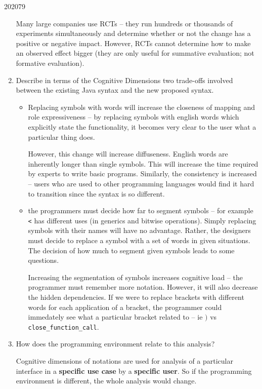 \documentclass[10pt,\jkfside,a4paper]{article}
\begin{document}
\begin{examquestion}{2020}{7}{9}
\begin{enumerate}
\begin{itemize}
\end{itemize}

Many large companies use RCTs -- they run hundreds or thousands of
experiments simultaneously and determine whether or not the change has a
positive or negative impact. However, RCTs cannot determine how to make an
observed effect bigger (they are only useful for summative evaluation; not
formative evaluation).

\item Describe in terms of the Cognitive Dimensions two trade-offs involved
between the existing Java syntax and the new proposed syntax.

\begin{itemize}

\item Replacing symbols with words will increase the closeness of mapping
and role expressiveness -- by replacing symbols with english words which
explicitly state the functionality, it becomes very clear to the user what
a particular thing does.

However, this change will increase diffuseness. English words are
inherently longer than single symbols. This will increase the time required
by experts to write basic programs. Similarly, the consistency is increased
-- users who are used to other programming languages would find it hard to
transition since the syntax is so different.

\item the programmers must decide how far to segment symbols -- for example
\texttt{<} has different uses (in generics and bitwise operations). Simply
replacing symbols with their names will have no advantage. Rather, the
designers must decide to replace a symbol with a set of words in given
situations. The decision of how much to segment given symbols leads to some
questions.

Increasing the segmentation of symbols increases cognitive load --
the programmer must remember more notation. However, it will also decrease
the hidden dependencies. If we were to replace brackets with different
words for each application of a bracket, the programmer could immedately
see what a particular bracket related to -- ie $)$ vs
\texttt{close\_function\_call}.

\end{itemize}

\item How does the programming environment relate to this analysis?

Cognitive dimensions of notations are used for analysis of a particular
interface in a \textbf{specific use case} by a \textbf{specific user}. So
if the programming environment is different, the whole analysis would change.


\end{enumerate}
\end{examquestion}
\end{document}
